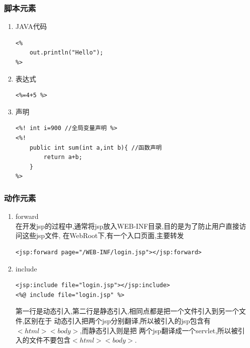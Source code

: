 \subsubsection{脚本元素}
\begin{enumerate}
\item JAVA代码
\begin{lstlisting}[style=JAVA]
<%
	out.println("Hello");
%>
\end{lstlisting}
\item 表达式
\begin{lstlisting}[style=JAVA]
<%=4+5 %>
\end{lstlisting}

\item 声明
\begin{lstlisting}[style=JAVA]
<%! int i=900 //全局变量声明 %>
<%! 
	public int sum(int a,int b){ //函数声明
		return a+b;	
	}
%>
\end{lstlisting}

\end{enumerate}

\subsubsection{动作元素}
\begin{enumerate}
\item forward\\
在开发jsp的过程中,通常将jsp放入WEB-INF目录,目的是为了防止用户直接访问这些jsp文件,
在WebRoot下,有一个入口页面,主要转发
\begin{lstlisting}[style=JAVA]
<jsp:forward page="/WEB-INF/login.jsp"></jsp:forward>
\end{lstlisting}

\item include\\
\begin{lstlisting}[style=JAVA]
<jsp:include file="login.jsp"></jsp:include>
<%@ include file="login.jsp" %>
\end{lstlisting}
第一行是动态引入,第二行是静态引入,相同点都是把一个文件引入到另一个文件,区别在于
动态引入把两个jsp分别翻译,所以被引入的jsp包含有$<html><body>$,而静态引入则是把
两个jsp翻译成一个servlet,所以被引入的文件不要包含$<html><body>$.
\end{enumerate}

